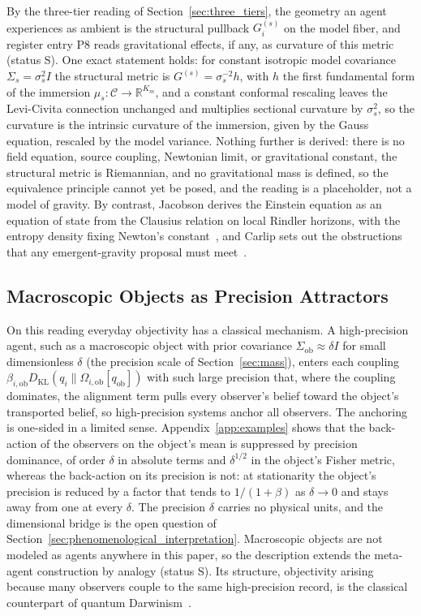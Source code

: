 By the three-tier reading of Section~\ref{sec:three_tiers}, the geometry an agent experiences as ambient is the structural pullback $G^{(s)}_i$ on the model fiber, and register entry P8 reads gravitational effects, if any, as curvature of this metric (status S). One exact statement holds: for constant isotropic model covariance $\Sigma_s = \sigma_s^2 I$ the structural metric is $G^{(s)} = \sigma_s^{-2} h$, with $h$ the first fundamental form of the immersion $\mu_s: \mathcal{C} \to \mathbb{R}^{K_m}$, and a constant conformal rescaling leaves the Levi-Civita connection unchanged and multiplies sectional curvature by $\sigma_s^2$, so the curvature is the intrinsic curvature of the immersion, given by the Gauss equation, rescaled by the model variance. Nothing further is derived: there is no field equation, source coupling, Newtonian limit, or gravitational constant, the structural metric is Riemannian, and no gravitational mass is defined, so the equivalence principle cannot yet be posed, and the reading is a placeholder, not a model of gravity. By contrast, Jacobson derives the Einstein equation as an equation of state from the Clausius relation on local Rindler horizons, with the entropy density fixing Newton's constant~\cite{Jacobson1995}, and Carlip sets out the obstructions that any emergent-gravity proposal must meet~\cite{Carlip2014}.

\subsection{Macroscopic Objects as Precision Attractors}

On this reading everyday objectivity has a classical mechanism. A high-precision agent, such as a macroscopic object with prior covariance $\Sigma_{\mathrm{ob}} \approx \delta I$ for small dimensionless $\delta$ (the precision scale of Section~\ref{sec:mass}), enters each coupling $\beta_{i,\mathrm{ob}} D_{\mathrm{KL}}(q_i \| \Omega_{i,\mathrm{ob}}[q_{\mathrm{ob}}])$ with such large precision that, where the coupling dominates, the alignment term pulls every observer's belief toward the object's transported belief, so high-precision systems anchor all observers. The anchoring is one-sided in a limited sense. Appendix~\ref{app:examples} shows that the back-action of the observers on the object's mean is suppressed by precision dominance, of order $\delta$ in absolute terms and $\delta^{1/2}$ in the object's Fisher metric, whereas the back-action on its precision is not: at stationarity the object's precision is reduced by a factor that tends to $1/(1+\beta)$ as $\delta \to 0$ and stays away from one at every $\delta$. The precision $\delta$ carries no physical units, and the dimensional bridge is the open question of Section~\ref{sec:phenomenological_interpretation}. Macroscopic objects are not modeled as agents anywhere in this paper, so the description extends the meta-agent construction by analogy (status S). Its structure, objectivity arising because many observers couple to the same high-precision record, is the classical counterpart of quantum Darwinism~\cite{Zurek2009}.

